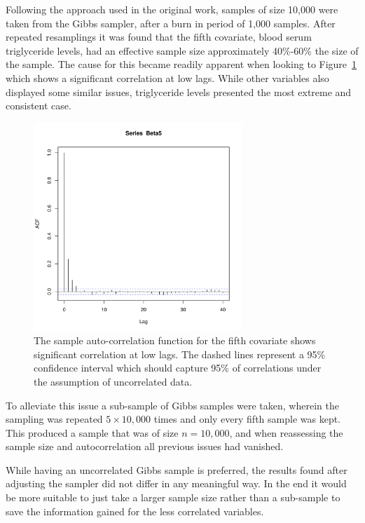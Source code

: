 \documentclass{uwstat572}
\begin{document}
Following the approach used in the original work, samples of size 10,000 were taken from the Gibbs sampler, after a burn in period of 1,000 samples. After repeated resamplings it was found that the fifth covariate, blood serum triglyceride levels, had an effective sample size approximately 40\%-60\% the size of the sample. The cause for this became readily apparent when looking to Figure~\ref{Var5} which shows a significant correlation at low lags. While other variables also displayed some similar issues, triglyceride levels presented the most extreme and consistent case.

\begin{figure}\label{Var5}
  \centering
    \includegraphics[width=0.7\textwidth]{Beta5ACFunsub.pdf}
  \caption{The sample auto-correlation function for the fifth covariate shows significant correlation at low lags. The dashed lines represent a 95\% confidence interval which should capture 95\% of correlations under the assumption of uncorrelated data.}
\end{figure}

To alleviate this issue a sub-sample of Gibbs samples were taken, wherein the sampling was repeated $5 \times 10,000$ times and only every fifth sample was kept. This produced a sample that was of size $n=10,000$, and when reassessing the sample size and autocorrelation all previous issues had vanished.

While having an uncorrelated Gibbs sample is preferred, the results found after adjusting the sampler did not differ in any meaningful way. In the end it would be more suitable to just take a larger sample size rather than a sub-sample to save the information gained for the less correlated variables.
\end{document}
